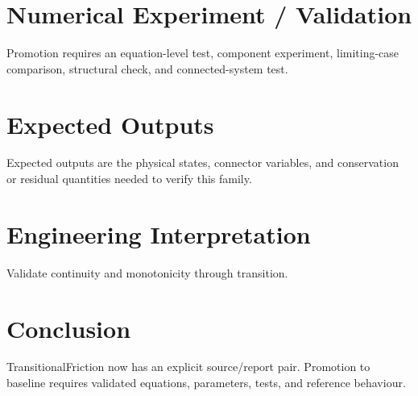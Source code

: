 \documentclass[10pt,a4paper]{article}
\begin{document}
\section{Numerical Experiment / Validation}Promotion requires an equation-level test, component experiment, limiting-case comparison, structural check, and connected-system test.
\section{Expected Outputs}Expected outputs are the physical states, connector variables, and conservation or residual quantities needed to verify this family.
\section{Engineering Interpretation}Validate continuity and monotonicity through transition.
\section*{Conclusion}TransitionalFriction now has an explicit source/report pair. Promotion to baseline requires validated equations, parameters, tests, and reference behaviour.
\end{document}
